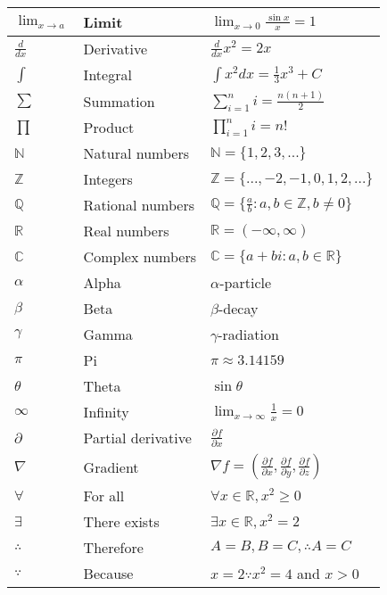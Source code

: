 \documentclass{article}
\begin{document}
\begin{longtable}{|p{}|p{}|p{}|}
$\lim_{x \to a}$ & Limit & $\lim_{x \to 0} \frac{\sin x}{x} = 1$ \\
\hline
$\frac{d}{dx}$ & Derivative & $\frac{d}{dx} x^2 = 2x$ \\
\hline
$\int$ & Integral & $\int x^2 dx = \frac{1}{3}x^3 + C$ \\
\hline
$\sum$ & Summation & $\sum_{i=1}^n i = \frac{n(n+1)}{2}$ \\
\hline
$\prod$ & Product & $\prod_{i=1}^n i = n!$ \\
\hline

$\mathbb{N}$ & Natural numbers & $\mathbb{N} = \{1, 2, 3, ...\}$ \\
\hline
$\mathbb{Z}$ & Integers & $\mathbb{Z} = \{..., -2, -1, 0, 1, 2, ...\}$ \\
\hline
$\mathbb{Q}$ & Rational numbers & $\mathbb{Q} = \{\frac{a}{b} : a,b \in \mathbb{Z}, b \neq 0\}$ \\
\hline
$\mathbb{R}$ & Real numbers & $\mathbb{R} = (-\infty, \infty)$ \\
\hline
$\mathbb{C}$ & Complex numbers & $\mathbb{C} = \{a + bi : a,b \in \mathbb{R}\}$ \\
\hline

$\alpha$ & Alpha & $\alpha$-particle \\
\hline
$\beta$ & Beta & $\beta$-decay \\
\hline
$\gamma$ & Gamma & $\gamma$-radiation \\
\hline
$\pi$ & Pi & $\pi \approx 3.14159$ \\
\hline
$\theta$ & Theta & $\sin \theta$ \\
\hline

$\infty$ & Infinity & $\lim_{x \to \infty} \frac{1}{x} = 0$ \\
\hline
$\partial$ & Partial derivative & $\frac{\partial f}{\partial x}$ \\
\hline
$\nabla$ & Gradient & $\nabla f = (\frac{\partial f}{\partial x}, \frac{\partial f}{\partial y}, \frac{\partial f}{\partial z})$ \\
\hline
$\forall$ & For all & $\forall x \in \mathbb{R}, x^2 \geq 0$ \\
\hline
$\exists$ & There exists & $\exists x \in \mathbb{R}, x^2 = 2$ \\
\hline
$\therefore$ & Therefore & $A = B, B = C, \therefore A = C$ \\
\hline
$\because$ & Because & $x = 2 \because x^2 = 4$ and $x > 0$ \\
\hline

\end{longtable}
\end{document}
